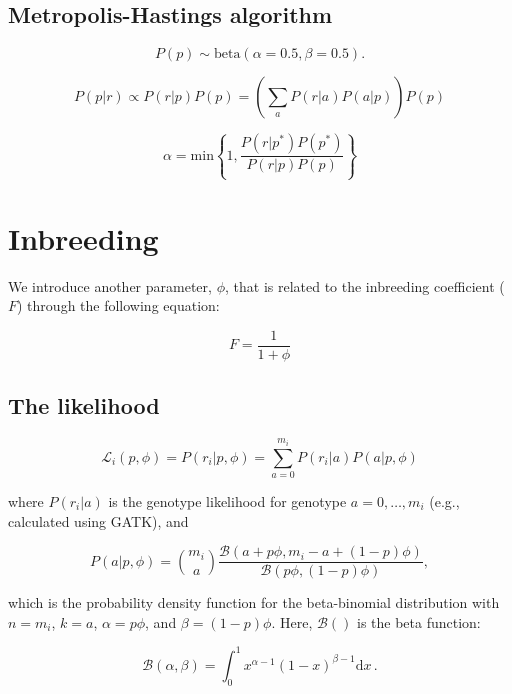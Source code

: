 \documentclass[11pt,english,letterpaper,oneside]{article}
\begin{document}
\subsection{Metropolis-Hastings algorithm}

\begin{equation}
P(p) \sim \text{beta}(\alpha = 0.5, \beta = 0.5).
\end{equation}

\begin{equation}
P(p|r) \propto P(r|p)P(p) = \left(\sum_a P(r|a)P(a|p)\right)P(p)
\end{equation}

\begin{equation}
\alpha = \text{min} \left\{1, \frac{P(r|p^*)P(p^*)}{P(r|p)P(p)} \right\}
\end{equation}

\section{Inbreeding}

We introduce another parameter, $\phi$, that is related to the inbreeding coefficient ($F$) through the following equation:

\begin{equation}
F = \frac{1}{1 + \phi}
\end{equation}

\subsection{The likelihood}

\begin{equation}
\mathcal{L}_i(p,\phi) = P(r_i|p,\phi) = \sum_{a=0}^{m_i} P(r_i|a)P(a|p,\phi)
\end{equation}

where $P(r_i|a)$ is the genotype likelihood for genotype $a = 0,\dots,m_i$ (e.g., calculated using GATK), and 

\begin{equation*}
P(a | p,\phi) = \binom{m_i}{a} \frac{\mathcal{B}(a + p\phi, m_i - a + (1 - p)\phi)}{\mathcal{B}(p\phi, (1 - p)\phi)},
\end{equation*}

which is the probability density function for the beta-binomial distribution with $n = m_i$, $k = a$, $\alpha = p\phi$, and $\beta = (1 - p)\phi$. Here, $\mathcal{B}()$ is the beta function:

\begin{equation*}
\mathcal{B}(\alpha,\beta) = \int_0^1 x^{\alpha-1} (1 - x)^{\beta - 1} \text{d}x\, .
\end{equation*}
\end{document}

